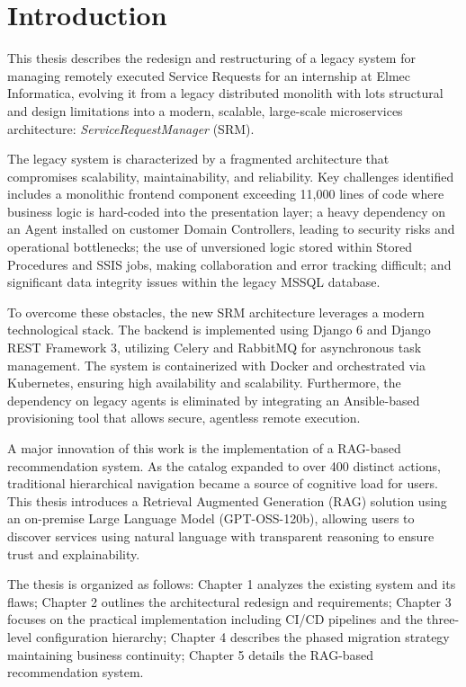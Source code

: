\chapter*{Introduction}

This thesis describes the redesign and restructuring of a legacy system for managing remotely executed Service Requests for an internship at Elmec Informatica, evolving it from a legacy distributed monolith with lots structural and design limitations into a modern, scalable, large-scale microservices architecture: \textit{ServiceRequestManager} (SRM).

The legacy system is characterized by a fragmented architecture that compromises scalability, maintainability, and reliability. Key challenges identified includes a monolithic frontend component exceeding 11,000 lines of code where business logic is hard-coded into the presentation layer; a heavy dependency on an Agent installed on customer Domain Controllers, leading to security risks and operational bottlenecks; the use of unversioned logic stored within Stored Procedures and SSIS jobs, making collaboration and error tracking difficult; and significant data integrity issues within the legacy MSSQL database.

To overcome these obstacles, the new SRM architecture leverages a modern technological stack. The backend is implemented using Django 6 and Django REST Framework 3, utilizing Celery and RabbitMQ for asynchronous task management. The system is containerized with Docker and orchestrated via Kubernetes, ensuring high availability and scalability. Furthermore, the dependency on legacy agents is eliminated by integrating an Ansible-based provisioning tool that allows secure, agentless remote execution.

A major innovation of this work is the implementation of a RAG-based recommendation system. As the catalog expanded to over 400 distinct actions, traditional hierarchical navigation became a source of cognitive load for users. This thesis introduces a Retrieval Augmented Generation (RAG) solution using an on-premise Large Language Model (GPT-OSS-120b), allowing users to discover services using natural language with transparent reasoning to ensure trust and explainability.

The thesis is organized as follows: Chapter 1 analyzes the existing system and its flaws; Chapter 2 outlines the architectural redesign and requirements; Chapter 3 focuses on the practical implementation including CI/CD pipelines and the three-level configuration hierarchy; Chapter 4 describes the phased migration strategy maintaining business continuity; Chapter 5 details the RAG-based recommendation system.
